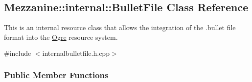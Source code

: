 \hypertarget{classMezzanine_1_1internal_1_1BulletFile}{
\subsection{Mezzanine::internal::BulletFile Class Reference}
\label{classMezzanine_1_1internal_1_1BulletFile}
}


This is an internal resource class that allows the integration of the .bullet file format into the \hyperlink{namespaceOgre}{Ogre} resource system.  




{\ttfamily \#include $<$internalbulletfile.h.cpp$>$}

\subsubsection*{Public Member Functions}
